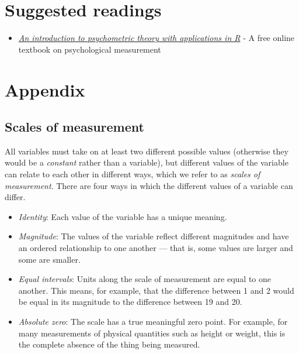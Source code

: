 \documentclass[12pt,]{book}
\providecommand{\tightlist}{%
  \setlength{\itemsep}{0pt}\setlength{\parskip}{0pt}}
\theoremstyle{definition}
\theoremstyle{definition}
\theoremstyle{definition}
\theoremstyle{remark}
\begin{document}
\hypertarget{suggested-readings-1}{%
\section{Suggested readings}\label{suggested-readings-1}}

\begin{itemize}
\tightlist
\item
  \href{http://www.personality-project.org/r/book/}{\emph{An introduction to psychometric theory with applications in R}} - A free online textbook on psychological measurement
\end{itemize}

\hypertarget{appendix}{%
\section{Appendix}\label{appendix}}

\hypertarget{scales-of-measurement}{%
\subsection{Scales of measurement}\label{scales-of-measurement}}

All variables must take on at least two different possible values (otherwise they would be a \emph{constant} rather than a variable), but different values of the variable can relate to each other in different ways, which we refer to as \emph{scales of measurement}. There are four ways in which the different values of a variable can differ.

\begin{itemize}
\tightlist
\item
  \emph{Identity}: Each value of the variable has a unique meaning.\\
\item
  \emph{Magnitude}: The values of the variable reflect different magnitudes and have an ordered relationship to one another --- that is, some values are larger and some are smaller.
\item
  \emph{Equal intervals}: Units along the scale of measurement are equal to one another. This means, for example, that the difference between 1 and 2 would be equal in its magnitude to the difference between 19 and 20.
\item
  \emph{Absolute zero}: The scale has a true meaningful zero point. For example, for many measurements of physical quantities such as height or weight, this is the complete absence of the thing being measured.
\end{itemize}
\end{document}
